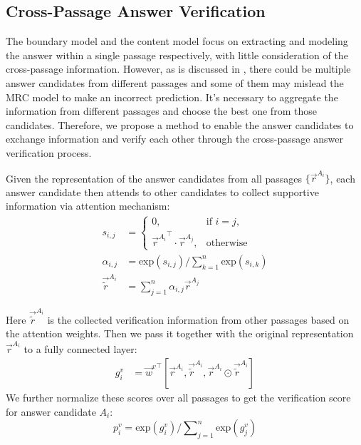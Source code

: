 \subsection{Cross-Passage Answer Verification}
\label{verification}

The boundary model and the content model focus on extracting and modeling the answer within a single passage respectively, 
with little consideration of the cross-passage information. 
However, as is discussed in , there could be multiple answer candidates from different passages
and some of them may mislead the MRC model to make an incorrect prediction. It's necessary to aggregate the information from different passages and choose the best one from those candidates. Therefore, we propose a method to enable the answer candidates to exchange information and verify each other through the cross-passage answer verification process. 

Given the representation of the answer candidates from all passages $\{\vec{r}^{A_{i}}\}$, each answer candidate then attends to other candidates to collect supportive information via attention mechanism:
\begin{align}
	s_{i, j} &= 
	 \begin{cases}
 		0, & \text{if } i=j, \\
 		{\vec{r}^{A_i}}^{\intercal} \cdot \vec{r}^{A_j},  & \text{otherwise}	
 \end{cases}
 \\
	{\alpha}_{i, j} &= \textrm{exp} (s_{i, j}) / \sum\nolimits_{k=1}^{n} \textrm{exp} (s_{i, k}) \\
	\vec{\tilde{r}}^{A_i} &= \sum\nolimits_{j=1}^{n} {\alpha}_{i, j}\vec{r}^{A_j}
\end{align}

Here $\vec{\tilde{r}}^{A_{i}}$ is the collected verification information from other passages based on the attention weights. Then we pass it together with the original representation $\vec{r}^{A_{i}}$ to a fully connected layer:
\begin{align}
	g_{i}^v &= {\vec{w}^v}^{\intercal} [\vec{r}^{A_i}, \vec{\tilde{r}}^{A_i}, \vec{r}^{A_i} \odot \vec{\tilde{r}}^{A_i} ]
\end{align}
We further normalize these scores over all passages to get the verification score for answer candidate $A_i$:
\begin{equation}
	p_i^v = \textrm{exp} (g_i^v) / \sum\nolimits_{j=1}^{n} \textrm{exp} (g_j^v)
\end{equation}

